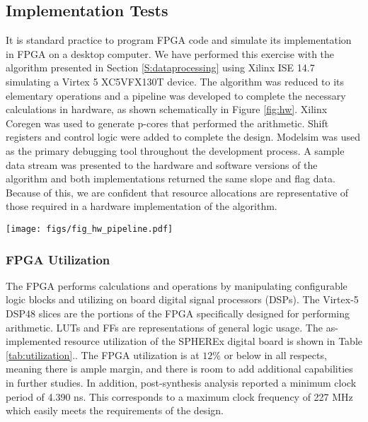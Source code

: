 \documentclass{ws-jai}
\begin{document}
\subsection{Implementation Tests}
\label{sS:implementation}

It is standard practice to program FPGA code and simulate its
implementation in FPGA on a desktop computer. We have performed this
exercise with the algorithm presented in Section
\ref{S:dataprocessing} using Xilinx ISE 14.7 simulating a Virtex 5
XC5VFX130T device.  The algorithm was reduced to its elementary
operations and a pipeline was developed to complete the necessary
calculations in hardware, as shown schematically in Figure
\ref{fig:hw}.  Xilinx Coregen was used to generate p-cores that
performed the arithmetic.  Shift registers and control logic were
added to complete the design. Modelsim was used as the primary
debugging tool throughout the development process.  A sample data
stream was presented to the hardware and software versions of the
algorithm and both implementations returned the same slope and flag
data. Because of this, we are confident that resource allocations are
representative of those required in a hardware implementation of the
algorithm.

\begin{figure*}[!p]
\centering
\texttt{[image: figs/fig\_hw\_pipeline.pdf]} 
\caption{A schematic of our on-board processing algorithm as implemented in a
  hardware simulation.  Each row represents one $100 \,$MHz clock
  cycle.  Cells containing variable names show the time required to
  produce an intermediary product of the algorithm.  The number of
  cycles required to complete an operation depends on the complexity
  of the operation.  Cells containing a "zX" value represent delays
  wait states required to ensure that input operand values are
  available during computation.  The running variance calculation
  requires the largest numbers of cycles to complete, largely because
  of the multiple floating point division operations in the
  calculation.  \label{fig:hw} }
\end{figure*}

\afterpage{\clearpage}

\subsubsection{FPGA Utilization}
\label{ssS:fpgaimplimentation}

The FPGA performs calculations and operations by manipulating
configurable logic blocks and utilizing on board digital signal
processors (DSPs).  The Virtex-5 DSP48 slices are the portions of the
FPGA specifically designed for performing arithmetic. LUTs and FFs are
representations of general logic usage. The as-implemented resource
utilization of the SPHEREx digital board is shown in Table
\ref{tab:utilization}.. The FPGA utilization is at $12\%$ or below in
all respects, meaning there is ample margin, and there is room to add
additional capabilities in further studies.  In addition,
post-synthesis analysis reported a minimum clock period of 4.390 ns.
This corresponds to a maximum clock frequency of 227 MHz which easily
meets the requirements of the design.
\end{document}
